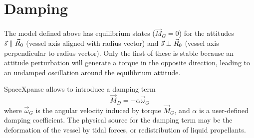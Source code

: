 \documentclass[a4paper]{article}
\begin{document}
\section{Damping}
The model defined above has equilibrium states ($\vec{M}_G = 0$) for the attitudes $\vec{s} \parallel \vec{R}_{0}$ (vessel axis aligned with radius vector) and $\vec{s} \perp \vec{R}_{0}$ (vessel axis perpendicular to radius vector). Only the first of these is stable because an attitude perturbation will generate a torque in the opposite direction, leading to an undamped oscillation around the equilibrium attitude.

SpaceXpanse allows to introduce a damping term
\begin{equation*}
\vec{M}_D = -\alpha\vec{\omega}_G
\end{equation*}
where $\vec{\omega}_G$ is the angular velocity induced by torque $\vec{M}_G$, and $\alpha$ is a user-defined damping coefficient. The physical source for the damping term may be the deformation of the vessel by tidal forces, or redistribution of liquid propellants.


\end{document}
